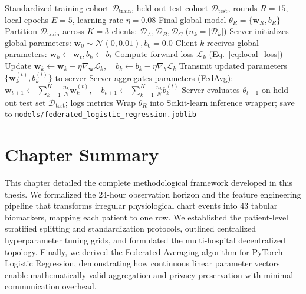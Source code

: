 \documentclass[12pt,a4paper,oneside]{report}
\begin{document}
\begin{algorithm}[htbp]
\caption{Federated Averaging (FedAvg) Clinical Training Pipeline}
\label{alg:federated}
\begin{algorithmic}[1]
\REQUIRE Standardized training cohort $\mathcal{D}_{\text{train}}$, held-out test cohort $\mathcal{D}_{\text{test}}$, rounds $R=15$, local epochs $E=5$, learning rate $\eta=0.08$
\ENSURE Final global model $\theta_R = \{\mathbf{w}_R, b_R\}$
\STATE Partition $\mathcal{D}_{\text{train}}$ across $K=3$ clients: $\mathcal{D}_A, \mathcal{D}_B, \mathcal{D}_C$ ($n_k = |\mathcal{D}_k|$)
\STATE Server initializes global parameters: $\mathbf{w}_0 \sim \mathcal{N}(0, 0.01), b_0 = 0.0$
        \STATE Client $k$ receives global parameters: $\mathbf{w}_k \leftarrow \mathbf{w}_t, b_k \leftarrow b_t$
                \STATE Compute forward loss $\mathcal{L}_k$ (Eq.~\ref{eq:local_loss})
                \STATE Update $\mathbf{w}_k \leftarrow \mathbf{w}_k - \eta \nabla_{\mathbf{w}} \mathcal{L}_k, \quad b_k \leftarrow b_k - \eta \nabla_{b} \mathcal{L}_k$
            \ENDFOR
        \ENDFOR
        \STATE Transmit updated parameters $\{\mathbf{w}_k^{(t)}, b_k^{(t)}\}$ to server
    \ENDFOR
    \STATE Server aggregates parameters (FedAvg):
    \STATE $\mathbf{w}_{t+1} \leftarrow \sum_{k=1}^K \frac{n_k}{N} \mathbf{w}_k^{(t)}, \quad b_{t+1} \leftarrow \sum_{k=1}^K \frac{n_k}{N} b_k^{(t)}$
    \STATE Server evaluates $\theta_{t+1}$ on held-out test set $\mathcal{D}_{\text{test}}$; logs metrics
\ENDFOR
\STATE Wrap $\theta_R$ into Scikit-learn inference wrapper; save to \texttt{models/federated\_logistic\_regression.joblib}
\end{algorithmic}
\end{algorithm}

\section{Chapter Summary}
\label{sec:chapter4_summary}

This chapter detailed the complete methodological framework developed in this thesis. We formalized the 24-hour observation horizon and the feature engineering pipeline that transforms irregular physiological chart events into 43 tabular biomarkers, mapping each patient to one row. We established the patient-level stratified splitting and standardization protocols, outlined centralized hyperparameter tuning grids, and formulated the multi-hospital decentralized topology. Finally, we derived the Federated Averaging algorithm for PyTorch Logistic Regression, demonstrating how continuous linear parameter vectors enable mathematically valid aggregation and privacy preservation with minimal communication overhead.
\end{document}
